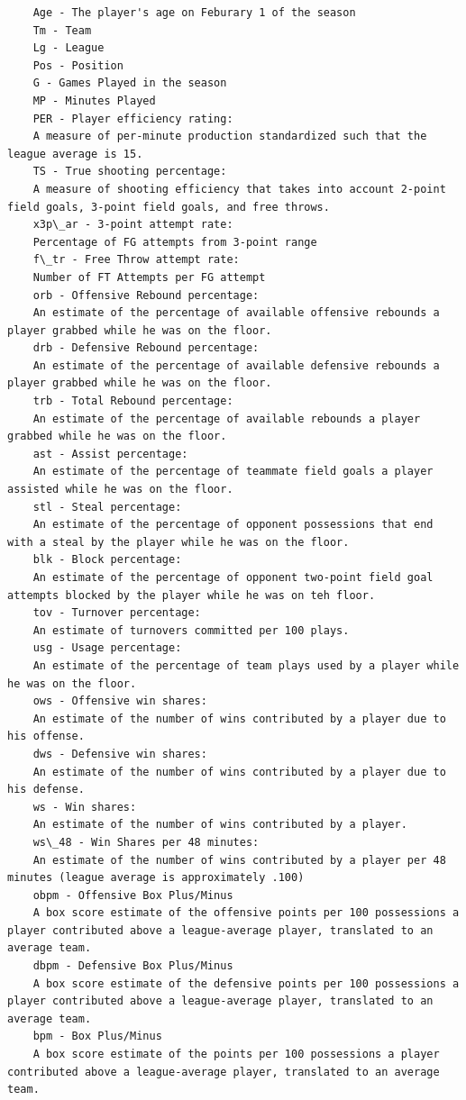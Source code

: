 \documentclass[12pt]{article}
\begin{document}
	\begin{lstlisting}
	Age - The player's age on Feburary 1 of the season
	Tm - Team
	Lg - League
	Pos - Position
	G - Games Played in the season
	MP - Minutes Played
	PER - Player efficiency rating:
	A measure of per-minute production standardized such that the league average is 15.
	TS - True shooting percentage:
	A measure of shooting efficiency that takes into account 2-point field goals, 3-point field goals, and free throws.
	x3p\_ar - 3-point attempt rate:
	Percentage of FG attempts from 3-point range
	f\_tr - Free Throw attempt rate:
	Number of FT Attempts per FG attempt
	orb - Offensive Rebound percentage:
	An estimate of the percentage of available offensive rebounds a player grabbed while he was on the floor.
	drb - Defensive Rebound percentage:
	An estimate of the percentage of available defensive rebounds a player grabbed while he was on the floor.
	trb - Total Rebound percentage:
	An estimate of the percentage of available rebounds a player grabbed while he was on the floor.
	ast - Assist percentage:
	An estimate of the percentage of teammate field goals a player assisted while he was on the floor.
	stl - Steal percentage:
	An estimate of the percentage of opponent possessions that end with a steal by the player while he was on the floor.
	blk - Block percentage:
	An estimate of the percentage of opponent two-point field goal attempts blocked by the player while he was on teh floor.
	tov - Turnover percentage:
	An estimate of turnovers committed per 100 plays.
	usg - Usage percentage:
	An estimate of the percentage of team plays used by a player while he was on the floor.
	ows - Offensive win shares:
	An estimate of the number of wins contributed by a player due to his offense.
	dws - Defensive win shares:
	An estimate of the number of wins contributed by a player due to his defense.
	ws - Win shares:
	An estimate of the number of wins contributed by a player.
	ws\_48 - Win Shares per 48 minutes:
	An estimate of the number of wins contributed by a player per 48 minutes (league average is approximately .100)
	obpm - Offensive Box Plus/Minus
	A box score estimate of the offensive points per 100 possessions a player contributed above a league-average player, translated to an average team.
	dbpm - Defensive Box Plus/Minus
	A box score estimate of the defensive points per 100 possessions a player contributed above a league-average player, translated to an average team.
	bpm - Box Plus/Minus
	A box score estimate of the points per 100 possessions a player contributed above a league-average player, translated to an average team.

\end{lstlisting}
\end{document}
